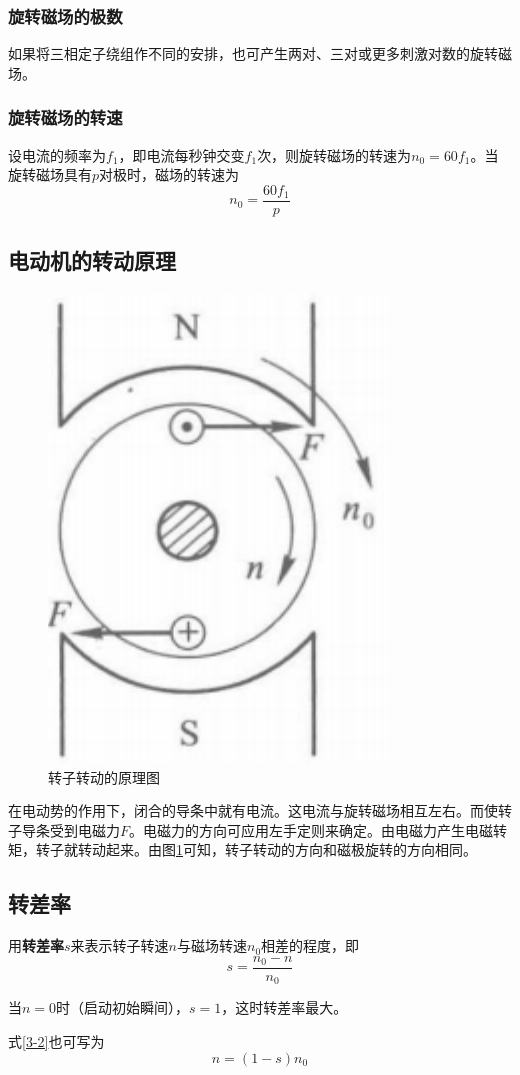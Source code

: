 \documentclass[12pt]{article}
\begin{document}
\subsubsection{旋转磁场的极数}

如果将三相定子绕组作不同的安排，也可产生两对、三对或更多刺激对数的旋转磁场。

\subsubsection{旋转磁场的转速}

设电流的频率为\(f_1\)，即电流每秒钟交变\(f_1\)次，则旋转磁场的转速为\(n_0 = 60 f_1\)。当旋转磁场具有\(p\)对极时，磁场的转速为
\begin{equation}
    n_0 = \frac{60 f_1}{p}
\end{equation}

\subsection{电动机的转动原理}

\begin{figure}[!h]
    \centering
    \includegraphics[width = .2\textwidth]{graphics/Screenshot 2025-09-15 at 18.52.30.png}
    \caption{转子转动的原理图}
    \label{转子转动的原理图}
\end{figure}

在电动势的作用下，闭合的导条中就有电流。这电流与旋转磁场相互左右。而使转子导条受到电磁力\(F\)。电磁力的方向可应用左手定则来确定。由电磁力产生电磁转矩，转子就转动起来。由图\ref{转子转动的原理图}可知，转子转动的方向和磁极旋转的方向相同。

\subsection{转差率}

用\textbf{转差率}\(s\)来表示转子转速\(n\)与磁场转速\(n_0\)相差的程度，即
\begin{equation}
    s = \frac{n_0 - n}{n_0}
    \label{3-2}
\end{equation}

当\(n=0\)时（启动初始瞬间），\(s=1\)，这时转差率最大。

式\ref{3-2}也可写为
\begin{equation}
    n = (1-s)n_0
\end{equation}
\end{document}
